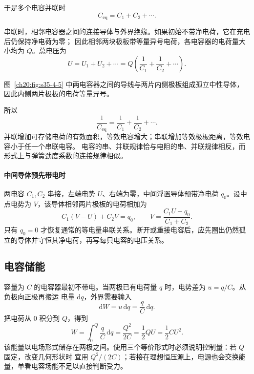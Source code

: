 {于是多个电容并联时
\begin{equation}
  \boxed{C_{\mathrm{eq}}=C_1+C_2+\cdots}.
\end{equation}

串联时，相邻电容器之间的连接导体与外界绝缘。如果初始不带净电荷，它在充电后仍保持净电荷为零；
因此相邻两块极板带等量异号电荷，各电容器的电荷量大小均为 $Q$。总电压为
\[
  U=U_1+U_2+\cdots=Q\left(\frac1{C_1}+\frac1{C_2}+\cdots\right).
\]

图~\ref{ch20:fig:s35-4-5} 中两电容器之间的导线与两片内侧极板组成孤立中性导体，因此内侧两片极板的电荷等量异号。

\par\noindent\begin{minipage}{\linewidth}
\capacitorSeriesFigure
{}\label{ch20:fig:s35-4-5}
\end{minipage}\par\medskip

所以
\begin{equation}
  \boxed{\frac1{C_{\mathrm{eq}}}=\frac1{C_1}+\frac1{C_2}+\cdots}.
\end{equation}
并联增加可存储电荷的有效面积，等效电容增大；串联增加等效极板距离，等效电容小于任一个串联电容。
电容的串、并联规律恰与电阻的串、并联规律相反，而形式上与弹簧劲度系数的连接规律相似。


\paragraph{中间导体预先带电时}
两电容 $C_1,C_2$ 串接，左端电势 $U$、右端为零，中间浮置导体预带净电荷 $q_0$。设中点电势为 $V$，该导体相邻两片极板的电荷相加为
\[
 C_1(V-U)+C_2V=q_0,
 \qquad V=\frac{C_1U+q_0}{C_1+C_2}.
\]
只有 $q_0=0$ 才恢复通常的等电量串联关系。断开或重接电容后，应先圈出仍然孤立的导体并守恒其净电荷，再写每只电容的电压关系。


\subsection{电容储能}


容量为 $C$ 的电容器最初不带电。当两极已有电荷量 $q$ 时，电势差为 $u=q/C$。从负极向正极再搬运
电量 $\mathrm dq$，外界需要输入
\begin{equation}
  \mathrm dW=u\,\mathrm dq=\frac qC\,\mathrm dq.
\end{equation}
把电荷从 $0$ 积分到 $Q$，得到
\begin{equation}
  \boxed{W=\int_0^Q\frac qC\,\mathrm dq
  =\frac{Q^2}{2C}=\frac12QU=\frac12CU^2}.
\end{equation}
该能量以电场形式储存在两极之间。使用三个等价形式时必须说明控制量：若 $Q$ 固定，改变几何形状时
宜用 $Q^2/(2C)$；若接在理想恒压源上，电源也会交换能量，单看电容场能不足以直接判断受力。


}
